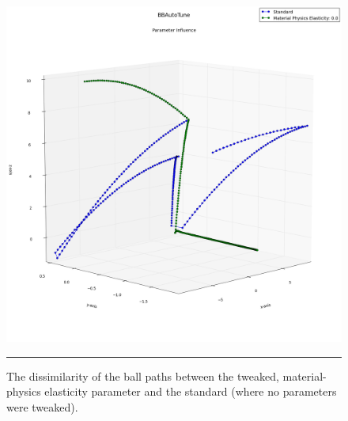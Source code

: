 \begin{figure}[htbp]
\centering
\includegraphics[scale=0.35]{../Figures/Chapter4/material_physics_ball_plot.png}
\rule{35em}{0.5pt}
\caption[Physics Engine Racquetball Path Dissimilarity]{The dissimilarity of the ball paths between the tweaked, material-physics elasticity parameter and the standard (where no parameters were tweaked).}
\label{fig:matphysplot}
\end{figure}

